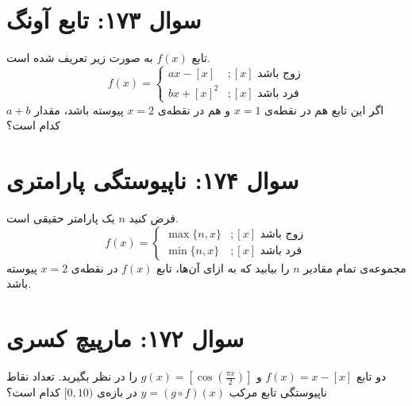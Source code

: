 \documentclass[12pt]{article}
\begin{document}
\section*{سوال ۱۷۳: تابع آونگ}
تابع \(f(x)\) به صورت زیر تعریف شده است.
\begin{displaymath}
	f(x) = 
	\begin{cases}
		ax - [x] & ;  [x] \text{ زوج باشد} \\
		bx + [x]^2 & ; [x] \text{ فرد باشد}
	\end{cases}
\end{displaymath}
اگر این تابع هم در نقطه‌ی \(x=1\) و هم در نقطه‌ی \(x=2\) پیوسته باشد، مقدار \(a+b\) کدام است؟

\vspace{1cm}
\hrulefill
\vspace{1cm}

\section*{سوال ۱۷۴: ناپیوستگی پارامتری}
فرض کنید \(n\) یک پارامتر حقیقی است.
\begin{displaymath}
	f(x) = 
	\begin{cases}
		\max\{n, x\} & ;  [x] \text{ زوج باشد} \\
		\min\{n, x\} & ;  [x] \text{ فرد باشد}
	\end{cases}
\end{displaymath}
مجموعه‌ی تمام مقادیر \(n\) را بیابید که به ازای آن‌ها، تابع \(f(x)\) در نقطه‌ی \(x=2\) پیوسته باشد.

\vspace{1cm}
\hrulefill
\vspace{1cm}
\section*{سوال ۱۷۲: مارپیچ کسری}
دو تابع \(f(x) = x - [x]\) و \(g(x) = \left[\cos\left(\frac{\pi x}{2}\right)\right]\) را در نظر بگیرید. تعداد نقاط ناپیوستگی تابع مرکب \(y = (g \circ f)(x)\) در بازه‌ی \( [0, 10) \) کدام است؟

\vspace{1cm}
\hrulefill
\vspace{1cm}
\end{document}

